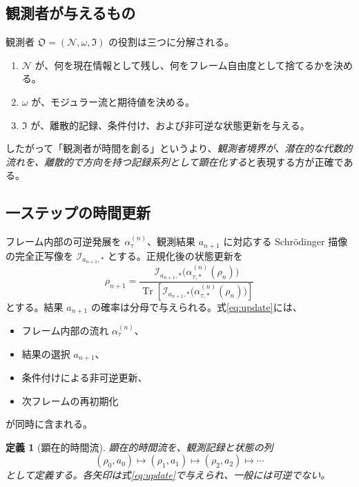 \documentclass[a4paper,11pt]{ltjsarticle}
\newtheorem{definition}{定義}[section]
\theoremstyle{remark}
\newcommand{\N}{\mathcal{N}}
\newcommand{\Tr}{\operatorname{Tr}}
\begin{document}
\subsection{観測者が与えるもの}
観測者 $\mathfrak O=(\N,\omega,\mathfrak I)$ の役割は三つに分解される。
\begin{enumerate}
  \item $\N$ が、何を現在情報として残し、何をフレーム自由度として捨てるかを決める。
  \item $\omega$ が、モジュラー流と期待値を決める。
  \item $\mathfrak I$ が、離散的記録、条件付け、および非可逆な状態更新を与える。
\end{enumerate}
したがって「観測者が時間を創る」というより、\emph{観測者境界が、潜在的な代数的流れを、離散的で方向を持つ記録系列として顕在化する}と表現する方が正確である。

\subsection{一ステップの時間更新}
フレーム内部の可逆発展を $\alpha_\tau^{(n)}$、観測結果 $a_{n+1}$ に対応する Schr\"odinger 描像の完全正写像を $\mathcal I_{a_{n+1},*}$ とする。正規化後の状態更新を
\begin{equation}
 \rho_{n+1}
 =\frac{\mathcal I_{a_{n+1},*}
 \bigl(\alpha_{\tau,*}^{(n)}(\rho_n)\bigr)}
 {\Tr\!\left[\mathcal I_{a_{n+1},*}
 \bigl(\alpha_{\tau,*}^{(n)}(\rho_n)\bigr)\right]}
 \label{eq:update}
\end{equation}
とする。結果 $a_{n+1}$ の確率は分母で与えられる。式\eqref{eq:update}には、
\begin{itemize}
  \item フレーム内部の流れ $\alpha_\tau^{(n)}$、
  \item 結果の選択 $a_{n+1}$、
  \item 条件付けによる非可逆更新、
  \item 次フレームの再初期化
\end{itemize}
が同時に含まれる。

\begin{definition}[顕在的時間流]
顕在的時間流を、観測記録と状態の列
\begin{equation}
 (\rho_0,a_0)\longmapsto(\rho_1,a_1)
 \longmapsto(\rho_2,a_2)\longmapsto\cdots
 \label{eq:manifestflow}
\end{equation}
として定義する。各矢印は式\eqref{eq:update}で与えられ、一般には可逆でない。
\end{definition}
\end{document}
